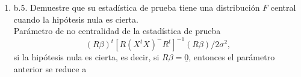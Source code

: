 \documentclass[12pt,a4paper]{report}
\begin{document}
\begin{itemize}
\begin{enumerate}
Se expresa en términos de $\alpha_1,\;\alpha_2,\;\alpha_3$, 

\[(R\beta)^t [R(X^tX)^{-}R^t]^{-1}(R\beta) = \beta^t R^t[R(X^tX)^{-}R^t]^{-1}R\beta\]

 $R^t[R(X^tX)^{-}R^t]^{-1}R$

\begin{verbatim}
> t(R)%*%solve(R%*%invXtX%*%t(R))%*%R
     [,1] [,2] [,3] [,4]
[1,]    0  0.0    0  0.0
[2,]    0  1.5   -1 -0.5
[3,]    0 -1.0    2 -1.0
[4,]    0 -0.5   -1  1.5
\end{verbatim}

Así, el parámetro de no centralidad se puede expresar como

\[\frac{1}{2\sigma^2}\begin{pmatrix}
\mu & \alpha_1 & \alpha_2 & \alpha_3
\end{pmatrix} \begin{pmatrix}
0 & 0 & 0 & 0 \\
0 & \frac{3}{2} & -1 & -\frac{1}{2} \\
0 & -1 & 2 & -1 \\
0 & -\frac{1}{2} & -1 & \frac{3}{2} \\
\end{pmatrix}\begin{pmatrix}
\mu \\ \alpha_1 \\ \alpha_2 \\ \alpha_3
\end{pmatrix}\] \[=\frac{1}{2\sigma^2}\begin{pmatrix}
0, & \frac{3}{2}\alpha_1- \alpha_2 - \frac{1}{2}\alpha_3, & - \alpha_1 + 2\alpha_2 -\alpha_3, & -\frac{1}{2}\alpha_1 - \alpha_2 + \frac{3}{2}\alpha_3
\end{pmatrix}\begin{pmatrix}
\mu \\ \alpha_1 \\ \alpha_2 \\ \alpha_3
\end{pmatrix}\]
\[=\frac{1}{2\sigma^2}\left(\frac{3}{2}\alpha_1^2 + 2 \alpha_2^2 + \frac{3}{2}\alpha_3^2 - 2\alpha_1 \alpha_2 - \alpha_1 \alpha_3 - 2 \alpha_2 \alpha_3\right).\]


\item b.5. Demuestre que su estadística de prueba tiene una distribución $F$ central cuando la hipótesis nula es cierta.\\

Parámetro de no centralidad  de la estadística de prueba \[(R\beta)^t [R(X^tX)^{-}R^t]^{-1}(R\beta)/2\sigma^2,\]
si la hipótesis nula es cierta, es decir, si $R\beta = \underline{0}$, entonces el parámetro anterior se reduce a


\end{enumerate}
\end{itemize}
\end{document}

